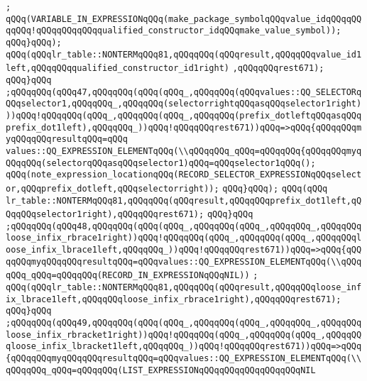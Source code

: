 \verb|;|\newline
\verb|qQQq(VARIABLE_IN_EXPRESSIONqQQq(make_package_symbolqQQqvalue_idqQQqqQQqqQQq!qQQqqQQqqQQqqualified_constructor_idqQQqmake_value_symbol));|\newline
\verb|qQQq}qQQq);|\newline
\verb|qQQq(qQQqlr_table::NONTERMqQQq81,qQQqqQQq(qQQqresult,qQQqqQQqvalue_id1left,qQQqqQQqqualified_constructor_id1right)|\newline
\verb|,qQQqqQQqrest671);|\newline
\verb|qQQq}qQQq|\newline
\verb|;qQQqqQQq(qQQq47,qQQqqQQq(qQQq(qQQq_,qQQqqQQq(qQQqvalues::QQ_SELECTORqQQqselector1,qQQqqQQq_,qQQqqQQq(selectorrightqQQqasqQQqselector1right)))qQQq!qQQqqQQq(qQQq_,qQQqqQQq(qQQq_,qQQqqQQq(prefix_dotleftqQQqasqQQqprefix_dot1left),qQQqqQQq_))qQQq!qQQqqQQqrest671))qQQq=>qQQq{qQQqqQQqmyqQQqqQQqresultqQQq=qQQq|\newline
\verb|values::QQ_EXPRESSION_ELEMENTqQQq(\\qQQqqQQq_qQQq=qQQqqQQq{qQQqqQQqmyqQQqqQQq(selectorqQQqasqQQqselector1)qQQq=qQQqselector1qQQq();|\newline
\verb|qQQq(note_expression_locationqQQq(RECORD_SELECTOR_EXPRESSIONqQQqselector,qQQqprefix_dotleft,qQQqselectorright));|\newline
\verb|qQQq}qQQq);|\newline
\verb|qQQq(qQQq|\newline
\verb|lr_table::NONTERMqQQq81,qQQqqQQq(qQQqresult,qQQqqQQqprefix_dot1left,qQQqqQQqselector1right),qQQqqQQqrest671);|\newline
\verb|qQQq}qQQq|\newline
\verb|;qQQqqQQq(qQQq48,qQQqqQQq(qQQq(qQQq_,qQQqqQQq(qQQq_,qQQqqQQq_,qQQqqQQqloose_infix_rbrace1right))qQQq!qQQqqQQq(qQQq_,qQQqqQQq(qQQq_,qQQqqQQqloose_infix_lbrace1left,qQQqqQQq_))qQQq!qQQqqQQqrest671))qQQq=>qQQq{qQQqqQQqmyqQQqqQQqresultqQQq=qQQqvalues::QQ_EXPRESSION_ELEMENTqQQq(\\qQQqqQQq_qQQq=qQQqqQQq(RECORD_IN_EXPRESSIONqQQqNIL))|\newline
\verb|;|\newline
\verb|qQQq(qQQqlr_table::NONTERMqQQq81,qQQqqQQq(qQQqresult,qQQqqQQqloose_infix_lbrace1left,qQQqqQQqloose_infix_rbrace1right),qQQqqQQqrest671);|\newline
\verb|qQQq}qQQq|\newline
\verb|;qQQqqQQq(qQQq49,qQQqqQQq(qQQq(qQQq_,qQQqqQQq(qQQq_,qQQqqQQq_,qQQqqQQqloose_infix_rbracket1right))qQQq!qQQqqQQq(qQQq_,qQQqqQQq(qQQq_,qQQqqQQqloose_infix_lbracket1left,qQQqqQQq_))qQQq!qQQqqQQqrest671))qQQq=>qQQq{qQQqqQQqmyqQQqqQQqresultqQQq=qQQqvalues::QQ_EXPRESSION_ELEMENTqQQq(\\qQQqqQQq_qQQq=qQQqqQQq(LIST_EXPRESSIONqQQqqQQqqQQqqQQqqQQqNIL|\newline
